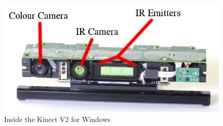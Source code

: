 \documentclass[11pt]{report}
\begin{document}
\begin{center}
	\begin{figure}[H]
		\begin{center}
			\includegraphics[scale=0.5]{pics/kinectinternal}
				\caption{Inside the Kinect V2 for Windows}
				\label{kinectinternal}
		\end{center}
	\end{figure}
\end{center}
\end{document}
